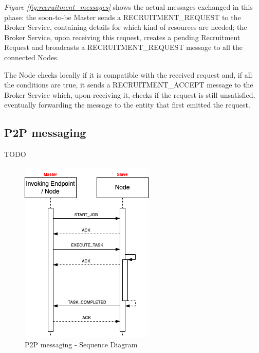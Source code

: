 \textit{Figure \ref{fig:recruitment_messages}} shows the actual messages exchanged in this phase: the soon-to-be Master sends a RECRUITMENT\_REQUEST to the Broker Service, containing details for which kind of resources are needed; the Broker Service, upon receiving this request, creates a pending Recruitment Request and broadcasts a RECRUITMENT\_REQUEST message to all the connected Nodes.

The Node checks locally if it is compatible with the received request and, if all the conditions are true, it sends a RECRUITMENT\_ACCEPT message to the Broker Service which, upon receiving it, checks if the request is still unsatisfied, eventually forwarding the message to the entity that first emitted the request.

\subsection{P2P messaging}
TODO
\begin{figure}[!ht]
    \centering
    \includegraphics[scale=0.8]{document/chapters/chapter_7/images/p2p_messages.png}
    \caption{P2P messaging - Sequence Diagram}
    \label{fig:p2p_messages}
\end{figure}